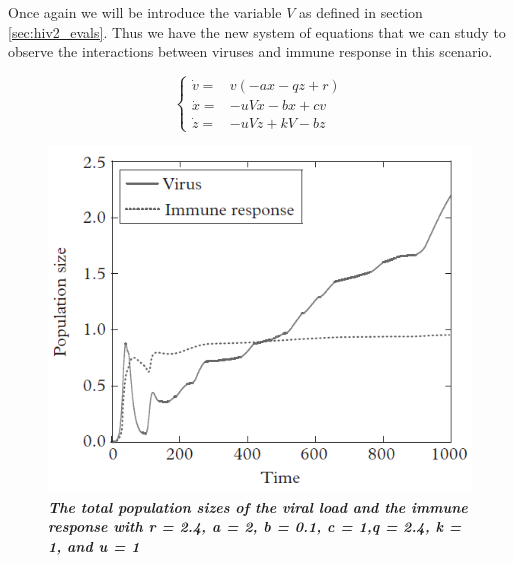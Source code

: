 \documentclass{article}
\begin{document}
Once again we will be introduce the variable $V$ as defined in section \ref{sec:hiv2_evals}. Thus we have the new system of equations that we can study to observe the interactions between viruses and immune response in this scenario.

\begin{equation}
	\begin{cases}
		\dot v=& v \left( -ax-qz+r \right) \\
		\dot x=& -uVx-bx+cv \\
		\dot z=& -uVz+kV-bz
	\end{cases}
\end{equation}

\begin{figure}[!tbp]
	\centering
	\includegraphics[scale=.5]{imgs/hiv_graph3.png}
	\caption{\textbf{\textit{The total population sizes of the
				viral load and the immune response with r = 2.4, a = 2, b = 0.1, c = 1,q = 2.4, k = 1, and u = 1}}}
	\label{fig:hiv3}
\end{figure}
\end{document}
